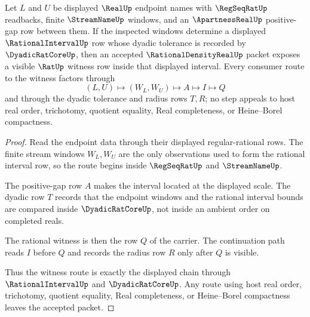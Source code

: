 \begin{theorem}\label{thm:rational-density-real-located-window-witness}
Let $L$ and $U$ be displayed $\RealUp$ endpoint names with $\RegSeqRatUp$ readbacks, finite $\StreamNameUp$ windows, and an $\ApartnessRealUp$ positive-gap row between them. If the inspected windows determine a displayed $\RationalIntervalUp$ row whose dyadic tolerance is recorded by $\DyadicRatCoreUp$, then an accepted $\RationalDensityRealUp$ packet exposes a visible $\RatUp$ witness row inside that displayed interval. Every consumer route to the witness factors through
$$
(L,U)\longmapsto (W_L,W_U)\longmapsto A\longmapsto I\longmapsto Q
$$
and through the dyadic tolerance and radius rows $T,R$; no step appeals to host real order, trichotomy, quotient equality, Real completeness, or Heine--Borel compactness.
\end{theorem}
\begin{proof}
Read the endpoint data through their displayed regular-rational rows. The finite stream windows $W_L,W_U$ are the only observations used to form the rational interval row, so the route begins inside $\RegSeqRatUp$ and $\StreamNameUp$.

The positive-gap row $A$ makes the interval located at the displayed scale. The dyadic row $T$ records that the endpoint windows and the rational interval bounds are compared inside $\DyadicRatCoreUp$, not inside an ambient order on completed reals.

The rational witness is then the row $Q$ of the carrier. The continuation path reads $I$ before $Q$ and records the radius row $R$ only after $Q$ is visible.

Thus the witness route is exactly the displayed chain through $\RationalIntervalUp$ and $\DyadicRatCoreUp$. Any route using host real order, trichotomy, quotient equality, Real completeness, or Heine--Borel compactness leaves the accepted packet.
\end{proof}

\begin{closurestatus}{\RationalDensityRealUp}
  \theoryclosure{\seedClosure}
  \formalstatus{\unformalizedV}
\end{closurestatus}
